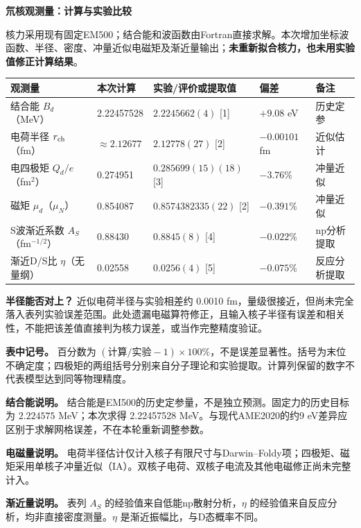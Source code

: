 \documentclass[UTF8,a4paper,landscape,10pt,fontset=fandol]{ctexart}
\newcommand{\pct}{\%}
\begin{document}
{\LARGE\bfseries\color{ink} 氘核观测量：计算与实验比较}\par
核力采用现有固定EM500；结合能和波函数由Fortran直接求解。本次增加坐标波函数、半径、密度、冲量近似电磁矩及渐近量输出；\textbf{未重新拟合核力，也未用实验值修正计算结果}。

\begin{tabularx}{\textwidth}{@{}p{63mm}p{33mm}p{53mm}p{31mm}X@{}}
\toprule
观测量 & 本次计算 & 实验/评价或提取值 & 偏差 & 备注 \\
\midrule
结合能 $B_d$（MeV） & 2.22457528 & $2.2245662(4)$ [1] & $+9.08$ eV & 历史定参 \\
电荷半径 $r_{\rm ch}$（fm） & $\approx 2.12677$ & $2.12778(27)$ [2] & $-0.00101$ fm & 近似估计 \\
电四极矩 $Q_d/e$（fm$^2$） & 0.274951 & $0.285699(15)(18)$ [3] & $-3.76\pct$ & 冲量近似 \\
磁矩 $\mu_d$（$\mu_N$） & 0.854087 & $0.8574382335(22)$ [2] & $-0.391\pct$ & 冲量近似 \\
S波渐近系数 $A_S$（fm$^{-1/2}$） & 0.88430 & $0.8845(8)$ [4] & $-0.022\pct$ & np分析提取 \\
渐近D/S比 $\eta$（无量纲） & 0.02558 & $0.0256(4)$ [5] & $-0.075\pct$ & 反应分析提取 \\
\bottomrule
\end{tabularx}

\textbf{半径能否对上？} 近似电荷半径与实验相差约 0.0010 fm，量级很接近，但尚未完全落入表列实验误差范围。此处遗漏电磁算符修正，且输入核子半径有误差和相关性，不能把该差值直接判为核力误差，或当作完整精度验证。

\textbf{表中记号。} 百分数为 $(\text{计算}/\text{实验}-1)\times100\%$，不是误差显著性。括号为末位不确定度；四极矩的两组括号分别来自分子理论和实验提取。计算列保留的数字不代表模型达到同等物理精度。

\textbf{结合能说明。} 结合能是EM500的历史定参量，不是独立预测。固定力的历史目标为 $2.224575$ MeV；本次求得 2.22457528 MeV。与现代AME2020的约9 eV差异应区别于求解网格误差，不在本轮重新调整参数。

\textbf{电磁量说明。} 电荷半径估计仅计入核子有限尺寸与Darwin--Foldy项；四极矩、磁矩采用单核子冲量近似（IA）。双核子电荷、双核子电流及其他电磁修正尚未完整计入。

\textbf{渐近量说明。} 表列 $A_S$ 的经验值来自低能np散射分析，$\eta$ 的经验值来自反应分析，均非直接密度测量。$\eta$ 是渐近振幅比，与D态概率不同。
\end{document}
